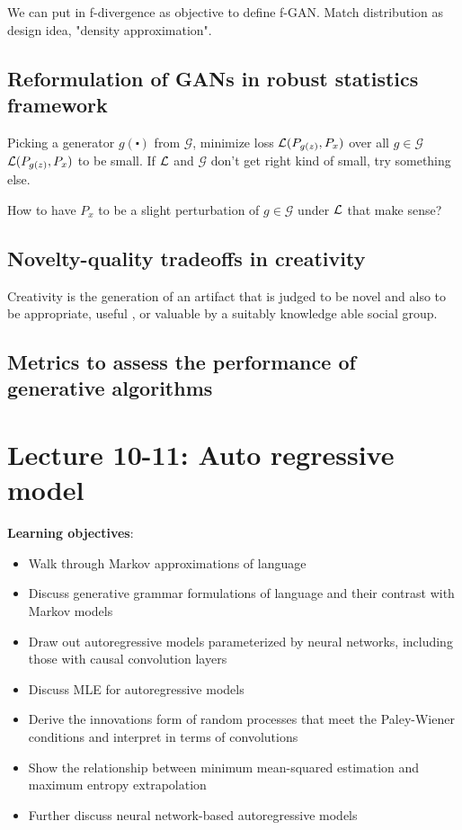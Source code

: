 \documentclass[12pt,a4paper]{article}
\begin{document}
We can put in f-divergence as objective to define f-GAN. Match distribution as design idea, "density approximation".


\subsection{Reformulation of GANs in robust statistics framework}
Picking a generator $g(\centerdot)$ from $\mathcal{G}$, minimize loss $\mathcal{L}(P_{g(z)}, P_x)$ over all $g\in \mathcal{G}$\\
$\mathcal{L}(P_{g(z)},P_x)$ to be small. If $\mathcal{L}$ and $\mathcal{G}$ don't get right kind of small, try something else. 

How to have $P_x$ to be a slight perturbation of $g\in \mathcal{G}$ under $\mathcal{L}$ that make sense?

\subsection{Novelty-quality tradeoffs in creativity}
Creativity is the generation of an artifact that is judged to be novel and also to be appropriate, useful , or valuable by a suitably knowledge able social group.



\subsection{Metrics to assess the performance of generative algorithms}


\newpage
\section{Lecture 10-11: Auto regressive model}
\textbf{Learning objectives}:

\begin{itemize}
\item Walk through Markov approximations of language
\item Discuss generative grammar formulations of language and their contrast with Markov models
\item Draw out autoregressive models parameterized by neural networks, including those with causal convolution layers
\item Discuss MLE for autoregressive models
\item Derive the innovations form of random processes that meet the Paley-Wiener conditions and interpret in terms of convolutions
\item Show the relationship between minimum mean-squared estimation and maximum entropy extrapolation
\item Further discuss neural network-based autoregressive models
\end{itemize}
\end{document}
